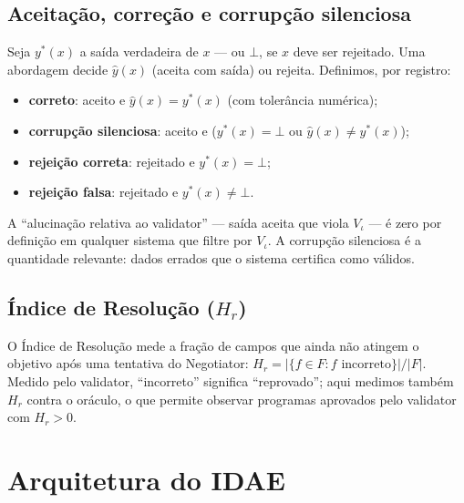 \documentclass[sigconf,nonacm]{acmart}
\begin{document}
\subsection{Aceitação, correção e corrupção silenciosa}

Seja $y^\ast(x)$ a saída verdadeira de $x$ --- ou $\bot$, se $x$ deve ser rejeitado. Uma abordagem decide $\hat{y}(x)$ (aceita com saída) ou rejeita. Definimos, por registro:

\begin{itemize}
\item \textbf{correto}: aceito e $\hat{y}(x) = y^\ast(x)$ (com tolerância numérica);
\item \textbf{corrupção silenciosa}: aceito e ($y^\ast(x) = \bot$ ou $\hat{y}(x) \neq y^\ast(x)$);
\item \textbf{rejeição correta}: rejeitado e $y^\ast(x) = \bot$;
\item \textbf{rejeição falsa}: rejeitado e $y^\ast(x) \neq \bot$.
\end{itemize}

A ``alucinação relativa ao validator'' --- saída aceita que viola $V_\iota$ --- é zero por definição em qualquer sistema que filtre por $V_\iota$. A corrupção silenciosa é a quantidade relevante: dados errados que o sistema certifica como válidos.

\subsection{Índice de Resolução ($H_r$)}

O Índice de Resolução mede a fração de campos que ainda não atingem o objetivo após uma tentativa do Negotiator: $H_r = |\{f \in F : f \text{ incorreto}\}| / |F|$. Medido pelo validator, ``incorreto'' significa ``reprovado''; aqui medimos também $H_r$ contra o oráculo, o que permite observar programas aprovados pelo validator com $H_r > 0$.

\section{Arquitetura do IDAE}
\label{sec:arq}
\end{document}
